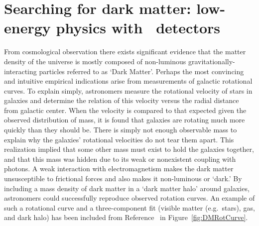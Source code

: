 

	\section{Searching for dark matter: low-energy physics with \ppc~detectors}
	
	
	From cosmological observation there exists significant evidence that the matter density of the universe is mostly composed of non-luminous gravitationally-interacting particles referred to as `Dark Matter'.  Perhaps the most convincing and intuitive empirical indications arise from measurements of galactic rotational curves.  To explain simply, astronomers measure the rotational velocity of stars in galaxies and determine the relation of this velocity versus the radial distance from galactic center.  When the velocity is compared to that expected given the observed distribution of mass, it is found that galaxies are rotating much more quickly than they should be.  There is simply not enough observable mass to explain why the galaxies' rotational velocities do not tear them apart.  This realization implied that some other mass must exist to hold the galaxies together, and that this mass was hidden due to its weak or nonexistent coupling with photons.  A weak interaction with electromagnetism makes the dark matter unsusceptible to frictional forces and also makes it non-luminous or `dark.'  By including a mass density of dark matter in a `dark matter halo' around galaxies, astronomers could successfully reproduce observed rotation curves.  An example of such a rotational curve and a three-component fit (visible matter (e.g.~stars), gas, and dark halo) has been included from Reference~\cite{Begeman:1991iy} in Figure~\ref{fig:DMRotCurve}.

